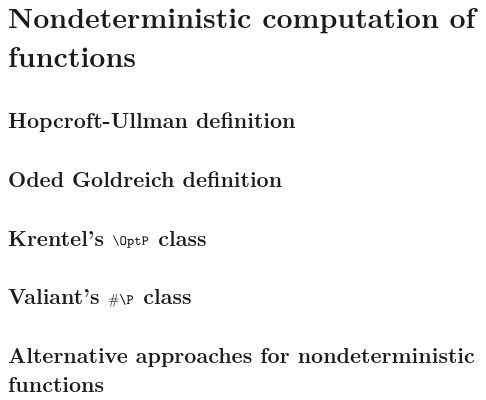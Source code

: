 \documentclass[12pt]{article}
\theoremstyle{definition}
\begin{document}
\section{Nondeterministic computation of functions}

\subsection{Hopcroft-Ullman definition}
\subsection{Oded Goldreich definition}
\subsection{Krentel's $\OptP$ class}
\subsection{Valiant's $\#\P$ class}
\subsection{Alternative approaches for nondeterministic functions}



\end{document}
